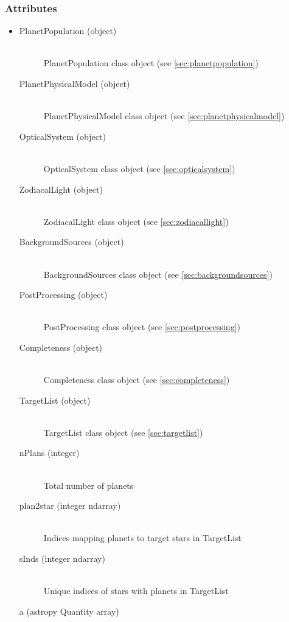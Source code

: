 \documentclass[cleanfoot]{asme2ej}
\begin{document}
\subsubsection{Attributes}
\begin{itemize}
    \item
    \begin{description}
        \item[PlanetPopulation (object)] \hfill \\
        PlanetPopulation class object (see \ref{sec:planetpopulation})
        \item[PlanetPhysicalModel (object)] \hfill \\
        PlanetPhysicalModel class object (see \ref{sec:planetphysicalmodel})
        \item[OpticalSystem (object)] \hfill \\
        OpticalSystem class object (see \ref{sec:opticalsystem})
        \item[ZodiacalLight (object)] \hfill \\
        ZodiacalLight class object (see \ref{sec:zodiacallight})
        \item[BackgroundSources (object)] \hfill \\
        BackgroundSources class object (see \ref{sec:backgroundsources})
        \item[PostProcessing (object)] \hfill \\
        PostProcessing class object (see \ref{sec:postprocessing})
        \item[Completeness (object)] \hfill \\
        Completeness class object (see \ref{sec:completeness})
        \item[TargetList (object)] \hfill \\
        TargetList class object (see \ref{sec:targetlist})
        \item[nPlans (integer)] \hfill \\
        Total number of planets
        \item[plan2star (integer ndarray)] \hfill \\
        Indices mapping planets to target stars in TargetList
        \item[sInds (integer ndarray)] \hfill \\
        Unique indices of stars with planets in TargetList
        \item[a (astropy Quantity array)] \hfill \\

\end{description}
\end{itemize}
\end{document}
